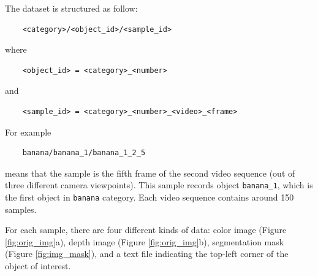 The dataset is structured as follow:
\begin{verbatim}
    <category>/<object_id>/<sample_id>
\end{verbatim}
where
\begin{verbatim}
    <object_id> = <category>_<number>
\end{verbatim}
and
\begin{verbatim}
    <sample_id> = <category>_<number>_<video>_<frame>
\end{verbatim}
For example
\begin{verbatim}
    banana/banana_1/banana_1_2_5
\end{verbatim}
means that the sample is the fifth frame of the second video sequence (out of three different camera viewpoints). This sample records object \texttt{banana\_1}, which is the first object in \texttt{banana} category. Each video sequence contains around 150 samples.

For each sample, there are four different kinds of data: color image (Figure \ref{fig:orig_img}a), depth image (Figure \ref{fig:orig_img}b), segmentation mask (Figure \ref{fig:img_mask}), and a text file indicating the top-left corner of the object of interest.

